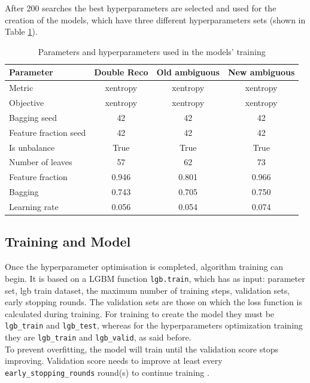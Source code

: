 \documentclass[a4paper, oneside]{book}
\begin{document}
				After 200 searches the best hyperparameters are selected and used for the creation of the models, which have three different hyperparameters sets (shown in Table \ref{tab:parameters}).
				
				\begin{table}
					\centering
					\begin{tabular}{lccc}
						\toprule[1.5pt]
						\textbf{Parameter} & \textbf{Double Reco} & \textbf{Old ambiguous} & \textbf{New ambiguous} \\
						\midrule
						Metric & xentropy & xentropy & xentropy \\
						Objective & xentropy & xentropy & xentropy \\
						Bagging seed & 42  & 42 & 42 \\
						Feature fraction seed & 42 & 42 & 42 \\
						Is unbalance & True & True & True \\
						Number of leaves & 57 & 62 & 73 \\
						Feature fraction & 0.946 & 0.801 & 0.966 \\
						Bagging & 0.743 & 0.705 & 0.750 \\
						Learning rate & 0.056 & 0.054 & 0.074 \\
						\bottomrule[1.5pt]
					\end{tabular}
					\caption{Parameters and hyperparameters used in the models' training}
					\label{tab:parameters} 
				\end{table}
			
			\subsection{Training and Model}
				Once the hyperparameter optimisation is completed, algorithm training can begin. It is based on a LGBM function \texttt{lgb.train}, which has as input: parameter set, lgb train dataset, the maximum number of training steps, validation sets,  early stopping rounds. The validation sets are those on which the loss function is calculated during training. For training to create the model they must be \texttt{lgb\_train} and \texttt{lgb\_test}, whereas for the hyperparameters optimization training they are \texttt{lgb\_train} and \texttt{lgb\_valid}, as said before. \\
				To prevent overfitting, the model will train until the validation score stops improving. Validation score needs to improve at least every \texttt{early\_stopping\_rounds} round(s) to continue training \cite{LGBM}.
				
\end{document}
